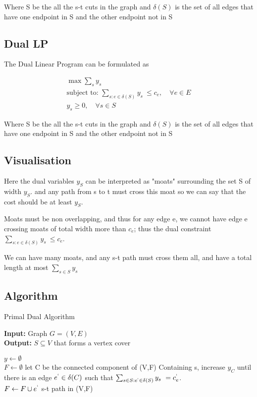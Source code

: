 \documentclass[11pt]{article}
\numberwithin{equation}{section}
\theoremstyle{definition}
\begin{document}
Where S be the  all the s-t cuts in the graph and 
$\delta(S)$ is the set of all edges that have one endpoint in S and the other endpoint not in S

\subsection{Dual LP}

    The Dual Linear Program can be formulated as 

\begin{align*}
\max \sum_s y_s \\
\text{subject to: }  \sum_{s : e \in \delta(S) }y_s\ \leq c_e, \hspace{1em} \forall  e \in E\\
y_s \geq 0, \hspace{1em}  \forall s \in S
\end{align*}

Where S be the  all the s-t cuts in the graph and 
$\delta(S)$ is the set of all edges that have one endpoint in S and the other endpoint not in S

\subsection{Visualisation}

Here the dual variables $y_S$ can be interpreted as "moats" surrounding the set S of width  $y_S$. and any path from s to t must cross this moat so we can say that the cost should be at least  $y_S$.

Moats must be non overlapping, and thus for any edge e, we cannot have edge e crossing moats of total width more than $c_e$; thus the dual constraint $\sum_{s : e \in \delta(S) }y_s\ \leq c_e$.

We can have many moats, and any s-t path must cross them all, and have a total length at most $ \sum_{s\in S} y_s $

\subsection{Algorithm}

\begin{algorithm}
	\caption{Primal Dual Algorithm}
	\label{alg:GreedyVC}
 
	\textbf{Input:} Graph $G=(V,E)$ \\
	\textbf{Output:} $S \subseteq V$ that  forms a vertex cover


	\begin{algorithmic}[1] 
		\STATE $y \leftarrow \emptyset$ \\ $F \leftarrow \emptyset$
		\STATE let C be the connected component of (V,F) Containing s,  increase $y_C$ until there is an edge $e^{`} \in \delta(C)$ such that $\sum_{s\in S : e^{`} \in \delta(S) }y_s\ = c_e^{`}$.\\
        \STATE $ F \leftarrow F \cup {e^{`}}$
        \ENDWHILE
        \RETURN s-t path in (V,F)
        
	\end{algorithmic}
\end{algorithm}
\end{document}
